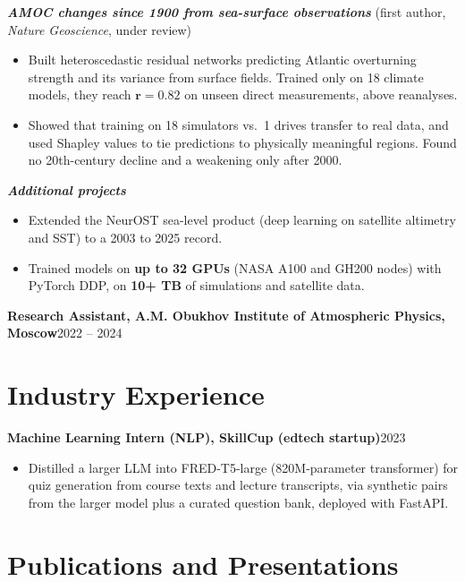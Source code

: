 \documentclass[letterpaper,10pt]{article}
\newcommand{\entry}[2]{%
  \noindent\textbf{#1}\hfill #2\par\nopagebreak\vspace{-0.5pt}
}
\newcommand{\proj}[1]{\vspace{1.5pt}\textbf{\textit{#1}}}
\begin{document}
\proj{AMOC changes since 1900 from sea-surface observations} (first author, \textit{Nature Geoscience}, under review)
\begin{itemize}
    \item Built heteroscedastic residual networks predicting Atlantic overturning strength and its variance from surface fields. Trained only on 18 climate models, they reach ${\mathbf{r = 0.82}}$ on unseen direct measurements, above reanalyses.
    \item Showed that training on 18 simulators vs.\ 1 drives transfer to real data, and used Shapley values to tie predictions to physically meaningful regions. Found no 20th-century decline and a weakening only after 2000.
\end{itemize}

\proj{Additional projects}
\begin{itemize}
    \item Extended the NeurOST sea-level product (deep learning on satellite altimetry and SST) to a 2003 to 2025 record.
    \item Trained models on \textbf{up to 32 GPUs} (NASA A100 and GH200 nodes) with PyTorch DDP, on \textbf{10+ TB} of simulations and satellite data.
\end{itemize}

\vspace{2pt}
\entry{Research Assistant, A.M. Obukhov Institute of Atmospheric Physics, Moscow}{2022 -- 2024}

\section{Industry Experience}

\entry{Machine Learning Intern (NLP), SkillCup \textnormal{(edtech startup)}}{2023}
\begin{itemize}
    \item Distilled a larger LLM into FRED-T5-large (820M-parameter transformer) for quiz generation from course texts and lecture transcripts, via synthetic pairs from the larger model plus a curated question bank, deployed with FastAPI.
\end{itemize}

\section{Publications and Presentations}
\end{document}
